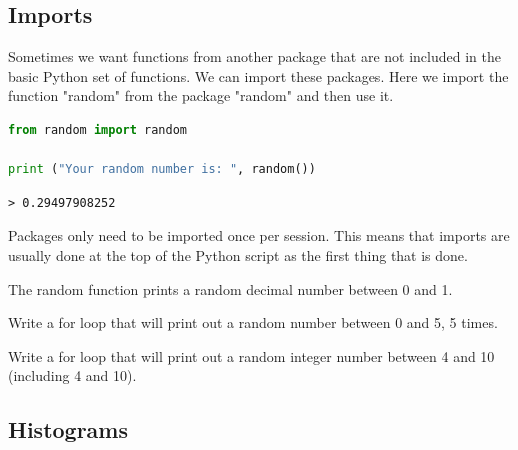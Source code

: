 	\subsection{Imports}
		Sometimes we want functions from another package that are not included in the basic Python set of functions. We can import these packages. Here we import the function "random" from the package "random" and then use it.
		\begin{lstlisting}[language=Python]
from random import random

print ("Your random number is: ", random())\end{lstlisting}
		\begin{verbatim}> 0.29497908252\end{verbatim}
		Packages only need to be imported once per session. This means that imports are usually done at the top of the Python script as the first thing that is done.
		
		The random function prints a random decimal number between 0 and 1.
		\begin{task}Write a for loop that will print out a random number between 0 and 5, 5 times.\end{task}
		\begin{task}Write a for loop that will print out a random integer number between 4 and 10 (including 4 and 10).\end{task}		

	\subsection{Histograms}
		
